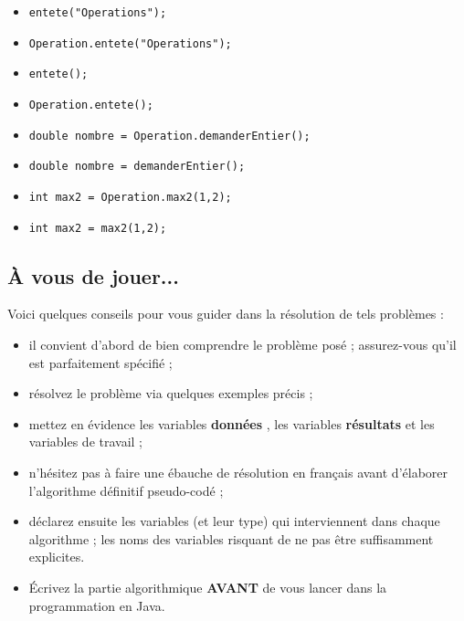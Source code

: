 \documentclass[11pt,a4paper]{article}
\begin{document}
            \begin{itemize} 
        
            \item[ \ding{"6F} ] \verb|entete("Operations");|
        
            \item[ \ding{"6F} ] \verb|Operation.entete("Operations");|
        
            \item[ \ding{"6F} ] \verb|entete();|
        
            \item[ \ding{"6F} ] \verb|Operation.entete();|
        
            \item[ \ding{"6F} ] \verb|double nombre = Operation.demanderEntier();|
        
            \item[ \ding{"6F} ] \verb|double nombre = demanderEntier();|
        
            \item[ \ding{"6F} ] \verb|int max2 = Operation.max2(1,2);|
        
            \item[ \ding{"6F} ] \verb|int max2 = max2(1,2);|
        
            \end{itemize} 
        \subsection{\`A vous de jouer...}
          Voici quelques conseils pour vous guider dans la r\'esolution de tels probl\`emes :
          
					\begin{itemize}
				
			\item il convient d'abord de bien comprendre le probl\`eme pos\'e ; assurez-vous qu'il est parfaitement sp\'ecifi\'e ;
			\item r\'esolvez le probl\`eme via quelques exemples pr\'ecis ;
			\item mettez en \'evidence les variables \textbf{\guillemotleft  donn\'ees \guillemotright }, les variables \textbf{\guillemotleft  r\'esultats \guillemotright } et les variables de travail ;
			\item n'h\'esitez pas \`a faire une \'ebauche de r\'esolution en fran\c cais avant d'\'elaborer l'algorithme d\'efinitif pseudo-cod\'e ;
			\item d\'eclarez ensuite les variables (et leur type) qui interviennent dans chaque algorithme ; les noms des variables risquant de ne pas \^etre suffisamment explicites.
			\item \'Ecrivez la partie algorithmique \textbf{AVANT} de vous lancer dans la programmation en Java.
					\end{itemize}
				
\end{document}

